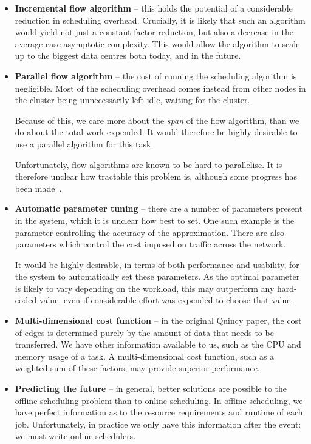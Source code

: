\begin{itemize}
  \item \textbf{Incremental flow algorithm} -- this holds the potential of a considerable reduction in scheduling overhead. Crucially, it is likely that such an algorithm would yield not just a constant factor reduction, but also a decrease in the average-case asymptotic complexity. This would allow the algorithm to scale up to the biggest data centres both today, and in the future.
  \item \textbf{Parallel flow algorithm} -- the cost of running the scheduling algorithm is negligible. Most of the scheduling overhead comes instead from other nodes in the cluster being unnecessarily left idle, waiting for the cluster.
    
    Because of this, we care more about the \emph{span} of the flow algorithm, than we do about the total work expended. It would therefore be highly desirable to use a parallel algorithm for this task.
    
    Unfortunately, flow algorithms are known to be hard to parallelise. It is therefore unclear how tractable this problem is, although some progress has been made~\cite{Staples:1995}.
  \item \textbf{Automatic parameter tuning} -- there are a number of parameters present in the system, which it is unclear how best to set. One such example is the parameter controlling the accuracy of the approximation. There are also parameters which control the cost imposed on traffic across the network.

        It would be highly desirable, in terms of both performance and usability, for the system to automatically set these parameters. As the optimal parameter is likely to vary depending on the workload, this may outperform any hard-coded value, even if considerable effort was expended to choose that value.
  \item \textbf{Multi-dimensional cost function} -- in the original Quincy paper, the cost of edges is determined purely by the amount of data that needs to be transferred. We have other information available to us, such as the CPU and memory usage of a task. A multi-dimensional cost function, such as a weighted sum of these factors, may provide superior performance.
  \item \textbf{Predicting the future} -- in general, better solutions are possible to the offline scheduling problem than to online scheduling. In offline scheduling, we have perfect information as to the resource requirements and runtime of each job. Unfortunately, in practice we only have this information after the event: we must write online schedulers.


\end{itemize}
